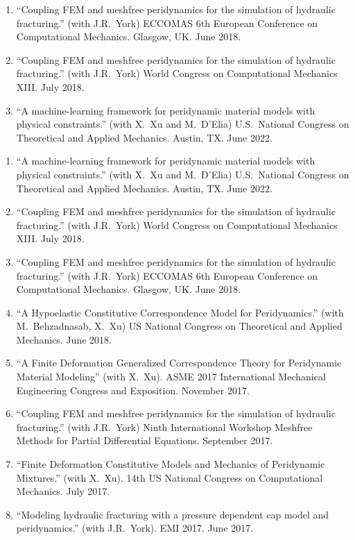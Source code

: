 \begin{enumerate}[resume]
    \item ``Coupling FEM and meshfree peridynamics for the simulation of hydraulic fracturing.'' (with J.R.\ York) ECCOMAS 6th European Conference on Computational Mechanics. Glasgow, UK. June 2018.
    \item ``Coupling FEM and meshfree peridynamics for the simulation of hydraulic fracturing.'' (with J.R.\ York) World Congress on Computational Mechanics XIII. July 2018.
    \item ``A machine-learning framework for peridynamic material models with physical constraints.'' (with X.\ Xu and M.\ D'Elia) U.S.\ National Congress on Theoretical and Applied Mechanics. Austin, TX.  June 2022.
\end{enumerate}
\else
\ifdefined\ispdf
\begin{etaremune}
\else
\begin{enumerate}
\fi
    \item ``A machine-learning framework for peridynamic material models with physical constraints.'' (with X.\ Xu and M.\ D'Elia) U.S.\ National Congress on Theoretical and Applied Mechanics. Austin, TX.  June 2022.
    \item ``Coupling FEM and meshfree peridynamics for the simulation of hydraulic fracturing.'' (with J.R.\ York) World Congress on Computational Mechanics XIII. July 2018.
    \item ``Coupling FEM and meshfree peridynamics for the simulation of hydraulic fracturing.'' (with J.R.\ York) ECCOMAS 6th European Conference on Computational Mechanics. Glasgow, UK. June 2018.
    \item ``A Hypoelastic Constitutive Correspondence Model for Peridynamics.'' (with M.\ Behzadnasab, X.\ Xu) US National Congress on Theoretical and Applied Mechanics. June 2018.
    \item ``A Finite Deformation Generalized Correspondence Theory for Peridynamic Material Modeling'' (with X.\ Xu). ASME 2017 International Mechanical Engineering Congress and Exposition. November 2017.
    \item ``Coupling FEM and meshfree peridynamics for the simulation of hydraulic fracturing.'' (with J.R.\ York) Ninth International Workshop Meshfree Methods for Partial Differential Equations. September 2017.
    \item ``Finite Deformation Constitutive Models and Mechanics of Peridynamic Mixtures.'' (with X.\ Xu). 14th US National Congress on Computational Mechanics. July 2017.
    \item ``Modeling hydraulic fracturing with a pressure dependent cap model and peridynamics.'' (with J.R.\ York). EMI 2017. June 2017.

\end{enumerate}
\end{etaremune}
